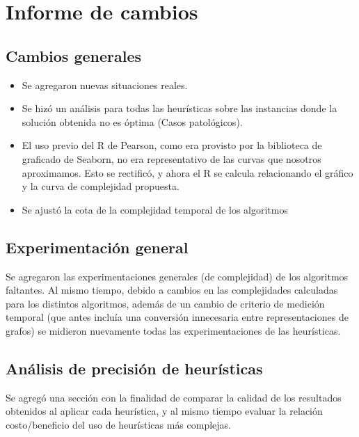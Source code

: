 \section{Informe de cambios}
	\subsection*{Cambios generales}
	
		\begin{itemize}
			\item Se agregaron nuevas situaciones reales.
			
			\item Se hizó un análisis para todas las heurísticas sobre las instancias donde la solución obtenida no es óptima (Casos patológicos).
			
			\item El uso previo del R de Pearson, como era provisto por la biblioteca de graficado de Seaborn, no era representativo de las curvas que nosotros aproximamos. Esto se rectificó, y ahora el R se calcula relacionando el gráfico y la curva de complejidad propuesta.			
			
			\item Se ajustó la cota de la complejidad temporal de los algoritmos
			
		\end{itemize}	

	\subsection*{Experimentación general}

		Se agregaron las experimentaciones generales (de complejidad) de los algoritmos faltantes. Al mismo tiempo, debido a cambios en las complejidades calculadas para los distintos algoritmos, además de un cambio de criterio de medición temporal (que antes incluía una conversión innecesaria entre representaciones de grafos) se midieron nuevamente todas las experimentaciones de las heurísticas.

	\subsection*{Análisis de precisión de heurísticas}

		Se agregó una sección con la finalidad de comparar la calidad de los resultados obtenidos al aplicar cada heurística, y al mismo tiempo evaluar la relación costo/beneficio del uso de heurísticas más complejas.


